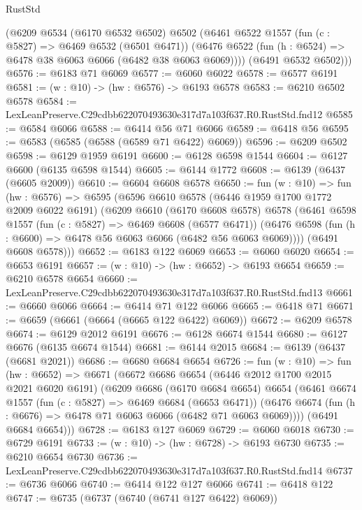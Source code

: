 \begin{lexlean}{RustStd}
\begin{coremodule}
      (@6209
        @6534
        (@6170 @6532 @6502)
        @6502
        (@6461
          @6522
          @1557
          (fun (c : @5827) => @6469 @6532 (@6501 @6471))
          (@6476 @6522 (fun (h : @6524) => @6478 @38 @6063 @6066 (@6482 @38 @6063 @6069))))
        (@6491 @6532 @6502)))
@6576 := @6183 @71 @6069
@6577 := @6060 @6022
@6578 := @6577 @6191
@6581 := (w : @10) -> (hw : @6576) -> @6193 @6578
@6583 := @6210 @6502 @6578
@6584 := LexLeanPreserve.C29cdbb622070493630e317d7a103f637.R0.RustStd.fnd12
@6585 := @6584 @6066
@6588 := @6414 @56 @71 @6066
@6589 := @6418 @56
@6595 := @6583 (@6585 (@6588 (@6589 @71 @6422) @6069))
@6596 := @6209 @6502
@6598 := @6129 @1959 @6191
@6600 := @6128 @6598 @1544
@6604 := @6127 @6600 (@6135 @6598 @1544)
@6605 := @6144 @1772
@6608 := @6139 (@6437 (@6605 @2009))
@6610 := @6604 @6608 @6578
@6650 := fun (w : @10) =>
  fun (hw : @6576) =>
  @6595
    (@6596
      @6610
      @6578
      (@6446 @1959 @1700 @1772 @2009 @6022 @6191)
      (@6209
        @6610
        (@6170 @6608 @6578)
        @6578
        (@6461
          @6598
          @1557
          (fun (c : @5827) => @6469 @6608 (@6577 @6471))
          (@6476 @6598 (fun (h : @6600) => @6478 @56 @6063 @6066 (@6482 @56 @6063 @6069))))
        (@6491 @6608 @6578)))
@6652 := @6183 @122 @6069
@6653 := @6060 @6020
@6654 := @6653 @6191
@6657 := (w : @10) -> (hw : @6652) -> @6193 @6654
@6659 := @6210 @6578 @6654
@6660 := LexLeanPreserve.C29cdbb622070493630e317d7a103f637.R0.RustStd.fnd13
@6661 := @6660 @6066
@6664 := @6414 @71 @122 @6066
@6665 := @6418 @71
@6671 := @6659 (@6661 (@6664 (@6665 @122 @6422) @6069))
@6672 := @6209 @6578
@6674 := @6129 @2012 @6191
@6676 := @6128 @6674 @1544
@6680 := @6127 @6676 (@6135 @6674 @1544)
@6681 := @6144 @2015
@6684 := @6139 (@6437 (@6681 @2021))
@6686 := @6680 @6684 @6654
@6726 := fun (w : @10) =>
  fun (hw : @6652) =>
  @6671
    (@6672
      @6686
      @6654
      (@6446 @2012 @1700 @2015 @2021 @6020 @6191)
      (@6209
        @6686
        (@6170 @6684 @6654)
        @6654
        (@6461
          @6674
          @1557
          (fun (c : @5827) => @6469 @6684 (@6653 @6471))
          (@6476 @6674 (fun (h : @6676) => @6478 @71 @6063 @6066 (@6482 @71 @6063 @6069))))
        (@6491 @6684 @6654)))
@6728 := @6183 @127 @6069
@6729 := @6060 @6018
@6730 := @6729 @6191
@6733 := (w : @10) -> (hw : @6728) -> @6193 @6730
@6735 := @6210 @6654 @6730
@6736 := LexLeanPreserve.C29cdbb622070493630e317d7a103f637.R0.RustStd.fnd14
@6737 := @6736 @6066
@6740 := @6414 @122 @127 @6066
@6741 := @6418 @122
@6747 := @6735 (@6737 (@6740 (@6741 @127 @6422) @6069))

\end{coremodule}
\end{lexlean}
